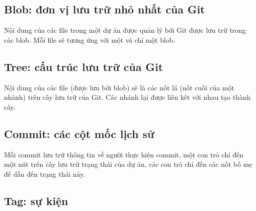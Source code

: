 \documentclass[12pt]{article}
\begin{document}
\subsection{Blob: đơn vị lưu trữ nhỏ nhất của Git}
Nội dung của các file trong một dự án được quản lý bởi Git được lưu trữ trong các blob. Mỗi file sẽ tương ứng với một và chỉ một blob.

\subsection{Tree: cấu trúc lưu trữ của Git}
Nội dung của các file (được lưu bởi blob) sẽ là các nốt lá (nốt cuối của một nhánh) trên cây lưu trữ của Git. Các nhánh lại được liên kết với nhau tạo thành cây.

\subsection{Commit: các cột mốc lịch sử}
Mỗi commit lưu trữ thông tin về người thực hiện commit, một con trỏ chỉ đến một nút trên cây lưu trữ trạng thái của dự án, các con trỏ chỉ đến các nốt bố mẹ để dẫn đến trạng thái này.

\subsection{Tag: sự kiện}

\printindex
\end{document}
